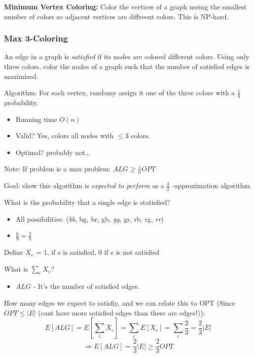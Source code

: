 \documentclass[11pt]{article}
\begin{document}
\textbf{\textbf{Minimum Vertex Coloring:}} Color the vertices of a graph useing the smallest number of colors so adjacent vertices are diffreent colors. This is NP-hard.

\subsubsection{Max 3-Coloring}
\label{sec:org4336505}

An edge in a graph is \emph{satisfied} if its nodes are colored different colors. Using only three colors, color the nodes of a graph such that the number of satisfied edges is maximized.


Algorithm: For each vertex, randomy assign it one of the three colors with a \(\frac{1}{3}\) probability.
\begin{itemize}
\item Running time \(O(n)\)
\item Valid? Yes, colors all nodes with \(\leq 3\) colors.
\item Optimal? probably not\ldots{}
\end{itemize}


Note: If problem is a max problem: \(ALG \geq \frac{1}{\alpha} OPT\)


Goal: show this algorithm is \emph{expected to perform} as a \(\frac{3}{2}\) -approximation algorithm.

What is the probability that a single edge is statisfied?
\begin{itemize}
\item All possibilities: (\emph{bb}, bg, br, gb, \emph{gg}, gr, rb, rg, \emph{rr})
\item \(\frac{6}{9} = \frac{2}{3}\)
\end{itemize}

Define \(X_e\) = 1, if e is satisfied, 0 if e is not satisfied



What is \(\sum_e X_e\)?
\begin{itemize}
\item \(ALG\) - It's the number of satisfied edges.
\end{itemize}

How many edges we expect to satisfiy, and we can relate this to OPT (Since \(OPT \leq |E|\) (cant have more satisfied edges than there are edges!)):
\[ E[ALG] = E [ \sum_e X_e] = \sum_e E[X_e] = \sum_e \frac{2}{3} = \frac{2}{3} |E| \]
\[  \Longrightarrow E[ALG] = \frac{2}{3} |E| \geq \frac{2}{3} OPT \]
\end{document}
